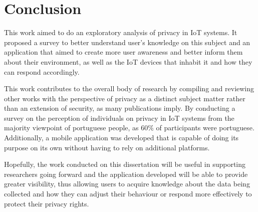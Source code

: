 %
%
\section{Conclusion}\label{section:conclusion}

This work aimed to do an exploratory analysis of privacy in IoT systems.
It proposed a survey to better understand user's knowledge on this subject
and an application that aimed to create more user awareness and better inform
them about their environment, as well as the IoT devices that inhabit it and
how they can respond accordingly.

This work contributes to the overall body of research by compiling and reviewing
other works with the perspective of privacy as a distinct subject matter rather than
an extension of security, as many publications imply. By conducting a survey
on the perception of individuals on privacy in IoT systems from the majority
viewpoint of portuguese people, as 60\% of participants were portuguese. Additionally,
a mobile application was developed that is capable of doing its purpose
on its own without having to rely on additional platforms.

Hopefully, the work conducted on this dissertation will be useful in
supporting researchers going forward and the application developed will be able to
provide greater visibility, thus allowing users to acquire knowledge about
the data being collected and how they can adjust their behaviour or respond
more effectively to protect their privacy rights.
